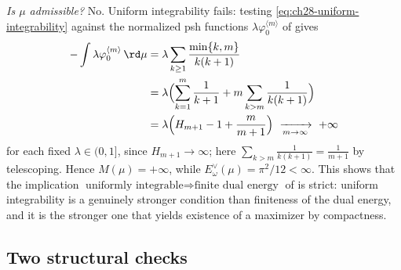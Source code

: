 \begin{example}
\emph{Is \(\mu\) admissible?}  No.  Uniform integrability fails:
testing \eqref{eq:ch28-uniform-integrability} against the normalized psh
functions \(\lambda\varphi_0^{\langle m\rangle}\) of
 gives
\[
 \begin{aligned}
 -\int\lambda\varphi_0^{\langle m\rangle}\,\rd\mu
 &=\lambda\sum_{k\geq1}\frac{\min\{k,m\}}{k(k+1)}\\
 &=\lambda\Bigl(\sum_{k=1}^{m}\frac1{k+1}
    +m\sum_{k>m}\frac1{k(k+1)}\Bigr)\\
 &=\lambda\Bigl(H_{m+1}-1+\frac{m}{m+1}\Bigr)
 \ \xrightarrow[m\to\infty]{}\ +\infty
 \end{aligned}
\]
for each fixed \(\lambda\in(0,1]\), since \(H_{m+1}\to\infty\); here
\(\sum_{k>m}\frac1{k(k+1)}=\frac1{m+1}\) by telescoping.
Hence \(M(\mu)=+\infty\), while \(E^\vee_\omega(\mu)=\pi^2/12<\infty\).
This shows that the implication
\(\text{uniformly integrable}\Rightarrow\text{finite dual energy}\) of
 is strict: uniform integrability is a genuinely
stronger condition than finiteness of the dual energy, and it is the
stronger one that yields existence of a maximizer by compactness.
\end{example}

\subsection{Two structural checks}
\label{sec:ch28-two-checks}

